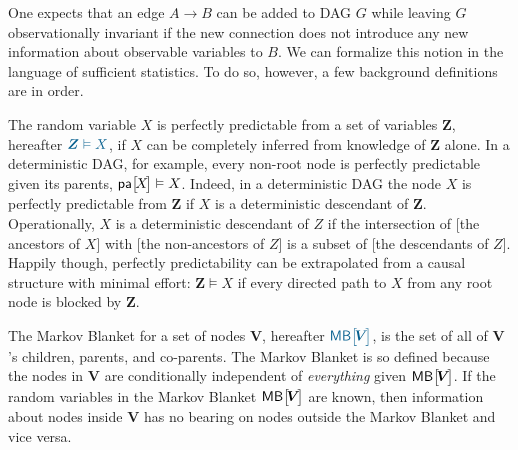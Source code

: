 {%


One expects that an edge $A\to B$ can be added to DAG $G$ while leaving $G$ observationally invariant if the new connection does not introduce any new information about observable variables to $B$. %
We can formalize this notion in the language of sufficient statistics. To do so, however, a few background definitions are in order.

 The random variable $X$ is perfectly predictable from a set of variables $\bm{Z}$, hereafter $\mblue{\bm{Z}\vDash X}$, if $X$ can be completely inferred from knowledge of $\bm{Z}$ alone. In a deterministic DAG, for example, every non-root node is perfectly predictable given its parents, ${\NamedFunction{pa}{\!X\!}\vDash X}$. Indeed, in a deterministic DAG the node $X$ is perfectly predictable from $\bm{Z}$ if $X$ is a deterministic descendant of $\bm{Z}$. Operationally, $X$ is a deterministic descendant of $Z$ if the intersection of {[the ancestors of $X$]} with {[the non-ancestors of $Z$]} is a subset of {[the descendants of $Z$]}. Happily though, perfectly predictability can be extrapolated from a causal structure with minimal effort: ${\bm{Z}\vDash X}$ if every directed path to $X$ from any root node is blocked by $\bm{Z}$. 

 The Markov Blanket for a set of nodes $\bm{V}$, hereafter $\mblue{\NamedFunction{MB}{\!\bm{V}\!}}$, is the set of all of $\bm{V}$'s children, parents, and co-parents. The Markov Blanket is so defined because the nodes in $\bm{V}$ are conditionally independent of \emph{everything} given $\NamedFunction{MB}{\!\bm{V}\!}$. If the random variables in the Markov Blanket $\NamedFunction{MB}{\!\bm{V}\!}$ are known, then information about nodes inside $\bm{V}$ has no bearing on nodes outside the Markov Blanket and vice versa.

}
